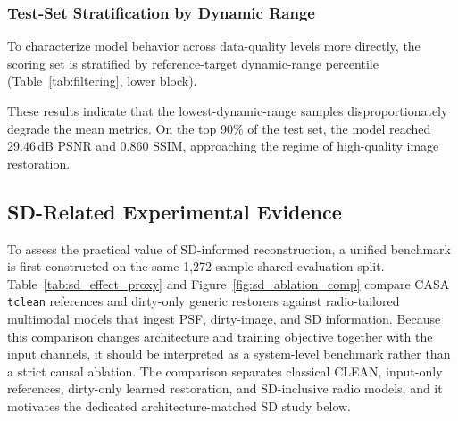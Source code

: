 \documentclass[twocolumn]{aastex631}
\begin{document}
\subsubsection{Test-Set Stratification by Dynamic Range}

To characterize model behavior across data-quality levels more directly, the scoring set is stratified by reference-target dynamic-range percentile (Table~\ref{tab:filtering}, lower block).

These results indicate that the lowest-dynamic-range samples disproportionately degrade the mean metrics.
On the top 90\% of the test set, the model reached 29.46\,dB PSNR and 0.860 SSIM, approaching the regime of high-quality image restoration.

\clearpage
\subsection{SD-Related Experimental Evidence}

To assess the practical value of SD-informed reconstruction, a unified benchmark is first constructed on the same 1,272-sample shared evaluation split.
Table~\ref{tab:sd_effect_proxy} and Figure~\ref{fig:sd_ablation_comp} compare CASA \texttt{tclean} references and dirty-only generic restorers against radio-tailored multimodal models that ingest PSF, dirty-image, and SD information.
Because this comparison changes architecture and training objective together with the input channels, it should be interpreted as a system-level benchmark rather than a strict causal ablation.
The comparison separates classical CLEAN, input-only references, dirty-only learned restoration, and SD-inclusive radio models, and it motivates the dedicated architecture-matched SD study below.
\end{document}
